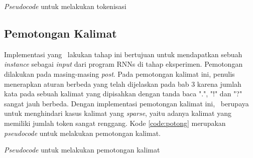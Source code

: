 \begin{kode}
	
	\caption{\textit{Pseudocode} untuk melakukan tokenisasi}
	\label{code:tokenisasi}
\end{kode}

\subsection{Pemotongan Kalimat}
Implementasi yang \saya~lakukan tahap ini bertujuan untuk mendapatkan sebuah \textit{instance} sebagai \textit{input} dari program RNNs di tahap eksperimen. Pemotongan dilakukan pada masing-masing \textit{post}. Pada pemotongan kalimat ini, penulis menerapkan aturan berbeda yang telah dijelaskan pada bab 3 karena jumlah kata pada sebuah kalimat yang dipisahkan dengan tanda baca ".", "!" dan "?" sangat jauh berbeda. Dengan implementasi pemotongan kalimat ini, \saya~berupaya untuk menghindari kasus kalimat yang \textit{sparse}, yaitu adanya kalimat yang memiliki jumlah token sangat renggang. Kode \ref{code:potong} merupakan \textit{pseudocode} untuk melakukan pemotongan kalimat.

\begin{kode}
	
	
	\caption{\textit{Pseudocode} untuk melakukan pemotongan kalimat}
	\label{code:potong}
\end{kode}

